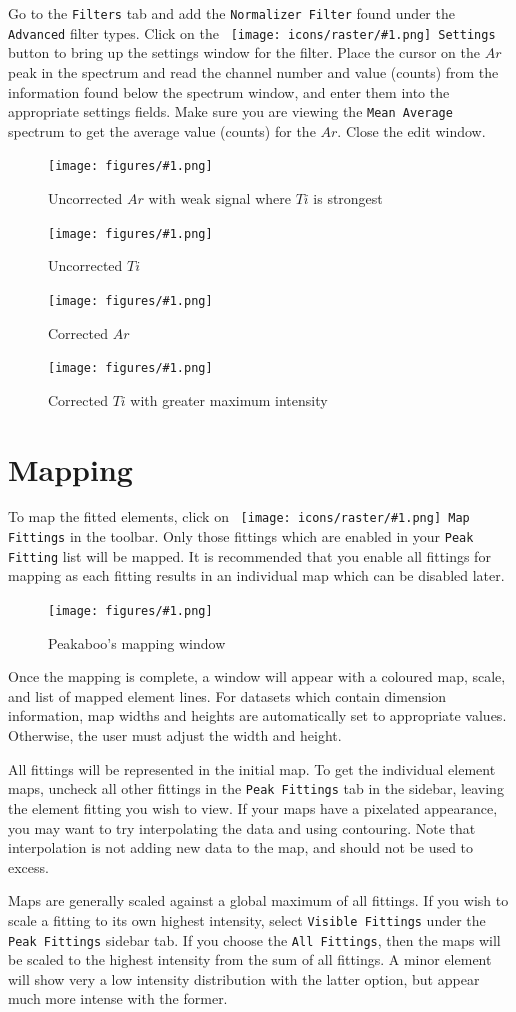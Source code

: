\documentclass[article,twoside,11pt]{report}
\newcommand{\command}[1]{\texttt{#1}}
\newcommand{\icon}[1]{\texttt{[image: icons/raster/\#1.png]}}
\newcommand{\button}[2]{\ \command{\icon{#1} #2}}
\newcommand{\element}[1]{$#1$}
\newcommand{\screenshot}[2]{%
\begin{figure}[h!]
\centering\texttt{[image: figures/\#1.png]}
\caption{#2}
\end{figure}
}
\newcommand{\tocchapter}[1]{\cleardoublepage\chapter*{#1}\addcontentsline{toc}{chapter}{#1}}
\begin{document}
Go to the \command{Filters} tab and add the \command{Normalizer Filter} found under the \command{Advanced} filter types. Click on the \button{misc-preferences}{Settings} button to bring up the settings window for the filter. Place the cursor on the \element{Ar} peak in the spectrum and read the channel number and value (counts) from the information found below the spectrum window, and enter them into the appropriate settings fields. Make sure you are viewing the \command{Mean Average} spectrum to get the average value (counts) for the \element{Ar}. Close the edit window.

\clearpage
\screenshot{normalize-uncorrected-ar}{Uncorrected \element{Ar} with weak signal where \element{Ti} is strongest} \screenshot{normalize-uncorrected-ti}{Uncorrected \element{Ti}} \screenshot{normalize-corrected-ar}{Corrected \element{Ar}} \screenshot{normalize-corrected-ti}{Corrected \element{Ti} with greater maximum intensity}



\tocchapter{Mapping}

To map the fitted elements, click on \button{map}{Map Fittings} in the toolbar. Only those fittings which are enabled in your \command{Peak Fitting} list will be mapped. It is recommended that you enable all fittings for mapping as each fitting results in an individual map which can be disabled later.

\screenshot{map-window}{Peakaboo's mapping window}

Once the mapping is complete, a window will appear with a coloured map, scale, and list of mapped element lines. For datasets which contain dimension information, map widths and heights are automatically set to appropriate values. Otherwise, the user must adjust the width and height. 

All fittings will be represented in the initial map. To get the individual element maps, uncheck all other fittings in the \command{Peak Fittings} tab in the sidebar, leaving the element fitting you wish to view. If your maps have a pixelated appearance, you may want to try interpolating the data and using contouring. Note that interpolation is not adding new data to the map, and should not be used to excess.

Maps are generally scaled against a global maximum of all fittings. If you wish to scale a fitting to its own highest intensity, select \command{Visible Fittings} under the \command{Peak Fittings} sidebar tab. If you choose the \command{All Fittings}, then the maps will be scaled to the highest intensity from the sum of all fittings. A minor element will show very a low intensity distribution with the latter option, but appear much more intense with the former.
\end{document}
